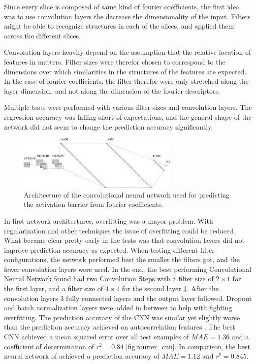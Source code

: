 
Since every slice is composed of same kind of fourier coefficients, the first idea was to use convolution layers the decrease the dimensionality of the input.
Filters might be able to recognize structures in each of the slices, and applied them across the different slices.

Convolution layers heavily depend on the assumption that the relative location of features in matters.
Filter sizes were therefor chosen to correspond to the dimensions over which similarities in the structures of the features are expected.
In the case of fourier coefficients, the filter therefor were only stretched along the layer dimension, and not along the dimension of the fourier descriptors.

Multiple tests were performed with various filter sizes and convolution layers.
The regression accuracy was falling short of expectations, and the general shape of the network did not seem to change the prediction accuracy significantly.

\begin{figure} [h]
    \centering
    \includegraphics[width=0.7\textwidth]{figures/regression/fourier/cnn/fourier_conv_layout.png} 
    \caption{
        Architecture of the convolutional neural network used for predicting the activation barrier from fourier coefficients.
    }
    \label{fig:cnn-architecture}
\end{figure}

In first network architectures, overfitting was a mayor problem.
With regularization and other techniques the issue of overfitting could be reduced.
What became clear pretty early in the tests was that convolution layers did not improve prediction accuracy as expected.
When testing different filter configurations, the network performed best the smaller the filters got, and the fewer convolution layers were used.
In the end, the best performing Convolutional Neural Network found had two Convolution Steps with a filter size of $2 \times 1$ for the first layer, and a filter size
of $4 \times 1$ for the second layer \ref{fig:cnn-architecture}.
After the convolution layers 3 fully connected layers and the output layer followed.
Dropout and batch normalization layers were added in between to help with fighting overfitting.
The prediction accuracy of the CNN was similar yet slightly worse than the prediction accuracy achieved on autocorrelation features \cite{friederich_dos}.
The best CNN achieved a mean squared error over all test examples of $MAE=1.36$ and a coefficient of determination of $r^2=0.84$ \ref{fig:fourier_cnn}.
In comparison, the best neural network of \cite{friederich_dos} achieved a prediction accuracy of $MAE=1.12$ and $r^2=0.845$.

